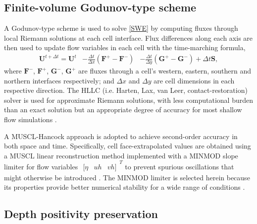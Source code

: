 \documentclass[11pt,english,a4paper]{article}
\begin{document}
\subsection{Finite-volume Godunov-type scheme}

A Godunov-type scheme \cite{Godunov_59} is used to solve \eqref{SWE} by computing fluxes through local Riemann solutions at each cell interface. Flux differences along each axis are then used to update flow variables in each cell with the time-marching formula, 
\begin{equation}
	\label{GodunovUpdate}
	\begin{alignedat}{2}
	\textbf{U}^{t+\Delta t} = \textbf{U}^t & - \frac{\Delta t}{\Delta x}(\textbf{F}^+ - \textbf{F}^-) 
					     &  - \frac{\Delta t}{\Delta y}(\textbf{G}^+ - \textbf{G}^-) + \Delta t \textbf{S} , 
	\end{alignedat}
\end{equation}
where \(\textbf{F}^-\), \(\textbf{F}^+\), \(\textbf{G}^-\), \(\textbf{G}^+\)  are fluxes through a cell's western, eastern, southern and northern interfaces respectively; and \(\Delta x\) and \(\Delta y\) are cell dimensions in each respective direction. The HLLC (i.e. Harten, Lax, van Leer, contact-restoration) solver \cite{Toro_94} is used for approximate Riemann solutions, with less computational burden than an exact solution but an appropriate degree of accuracy for most shallow flow simulations \cite{Erduran_02,Zoppou_03}.

A MUSCL-Hancock approach \cite{vanLeer_84} is adopted to achieve second-order accuracy in both space and time. Specifically, cell face-extrapolated values are obtained using a MUSCL linear reconstruction method implemented with a MINMOD slope limiter \cite{Roe_86} for flow variables \(\begin{matrix}[\eta & uh & vh]\end{matrix}^T\) to prevent spurious oscillations that might otherwise be introduced \cite{Toro_01}. The MINMOD limiter is selected herein because its properties provide better numerical stability for a wide range of conditions \cite{Suresh_00,Yee_06}.

\subsection{Depth positivity preservation}
\end{document}
